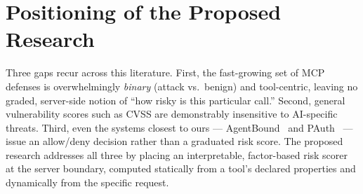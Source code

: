 \section{Positioning of the Proposed Research}
\label{sec:related_work:positioning}

Three gaps recur across this literature. First, the fast-growing set of MCP
defenses is overwhelmingly \emph{binary} (attack vs.\ benign) and tool-centric,
leaving no graded, server-side notion of ``how risky is this particular call.''
Second, general vulnerability scores such as CVSS are demonstrably insensitive to
AI-specific threats. Third, even the systems closest to ours ---
AgentBound~\cite{buhler2026agentbound} and PAuth~\cite{sharma2026pauth} --- issue
an allow/deny decision rather than a graduated risk score. The proposed research
addresses all three by placing an interpretable, factor-based risk scorer at the
server boundary, computed statically from a tool's declared properties and
dynamically from the specific request.
